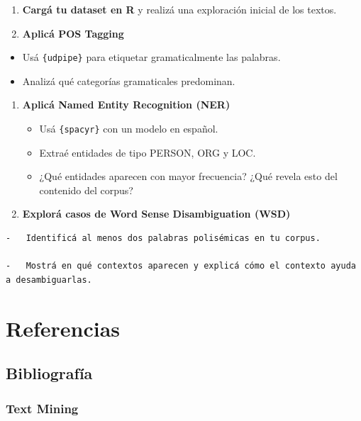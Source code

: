 \documentclass[
  letterpaper,
  DIV=11,
  numbers=noendperiod]{scrreprt}
\begin{document}
\begin{enumerate}
\def\labelenumi{\arabic{enumi}.}
\item
  \textbf{Cargá tu dataset en R} y realizá una exploración inicial de
  los textos.
\item
  \textbf{Aplicá POS Tagging}
\end{enumerate}

\begin{itemize}
\item
  Usá \texttt{\{udpipe\}} para etiquetar gramaticalmente las palabras.
\item
  Analizá qué categorías gramaticales predominan.
\end{itemize}

\begin{enumerate}
\def\labelenumi{\arabic{enumi}.}
\setcounter{enumi}{2}
\item
  \textbf{Aplicá Named Entity Recognition (NER)}

  \begin{itemize}
  \item
    Usá \texttt{\{spacyr\}} con un modelo en español.
  \item
    Extraé entidades de tipo PERSON, ORG y LOC.
  \item
    ¿Qué entidades aparecen con mayor frecuencia? ¿Qué revela esto del
    contenido del corpus?
  \end{itemize}
\item
  \textbf{Explorá casos de Word Sense Disambiguation (WSD)}
\end{enumerate}

\begin{verbatim}
-   Identificá al menos dos palabras polisémicas en tu corpus.

-   Mostrá en qué contextos aparecen y explicá cómo el contexto ayuda a desambiguarlas.
\end{verbatim}

\part{\textbf{Referencias}}

\chapter{Bibliografía}\label{bibliografuxeda}

\section{Text Mining}\label{text-mining}
\end{document}
